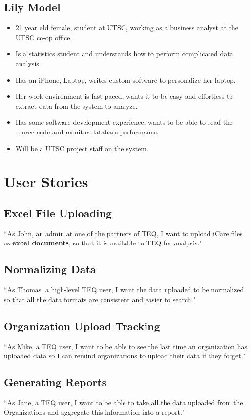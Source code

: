\documentclass[12pt]{article}
\begin{document}
 \subsection{Lily Model}
\begin{itemize}%
\item 21 year old female, student at UTSC, working as a business analyst at the UTSC co-op office.
\item Is a statistics student and understands how to perform complicated data analysis.
\item Has an iPhone, Laptop, writes custom software to personalize her laptop.
\item Her work environment is fast paced, wants it to be easy and effortless to extract data from the system to analyze. 
\item Has some software development experience, wants to be able to read the source code and monitor database performance.
\item Will be a UTSC project staff on the system.
 \end{itemize}

\pagebreak

\section{User Stories}
\setcounter{subsection}{1}
\subsection{Excel File Uploading}
``As John, an admin at one of the partners of TEQ, I want to upload iCare files as \textbf{excel documents}, so that it is available to TEQ for analysis."

\subsection{Normalizing Data}
``As Thomas, a high-level TEQ user, I want the data uploaded to be normalized so that all the data formats are consistent and easier to search."

\subsection{Organization Upload Tracking}
``As Mike, a TEQ user, I want to be able to see the last time an organization has uploaded data so I can remind organizations to upload their data if they forget."

\subsection{Generating Reports}
``As Jane, a TEQ user,  I want to be able to take all the data uploaded from the Organizations and aggregate this information into a report."
\end{document}
